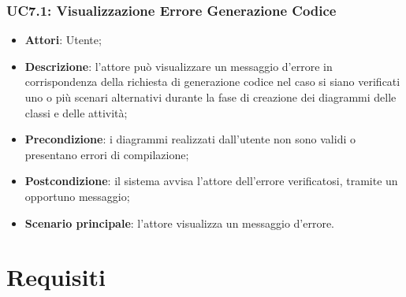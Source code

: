 \subsubsection{UC7.1: Visualizzazione Errore Generazione Codice}
\label{UC7.1}
\begin{itemize}
	\item \textbf{Attori}: Utente;
	\item \textbf{Descrizione}: l'attore può visualizzare un messaggio d'errore in corrispondenza della richiesta di generazione codice nel caso si siano verificati uno o più scenari alternativi durante la fase di creazione dei diagrammi delle classi e delle attività;
	\item \textbf{Precondizione}: i diagrammi realizzati dall'utente non sono validi o presentano errori di compilazione;%
	\item \textbf{Postcondizione}: il sistema avvisa l'attore dell'errore verificatosi, tramite un opportuno messaggio;
	\item \textbf{Scenario principale}: l'attore visualizza un messaggio d'errore.
\end{itemize}




\section{Requisiti}

